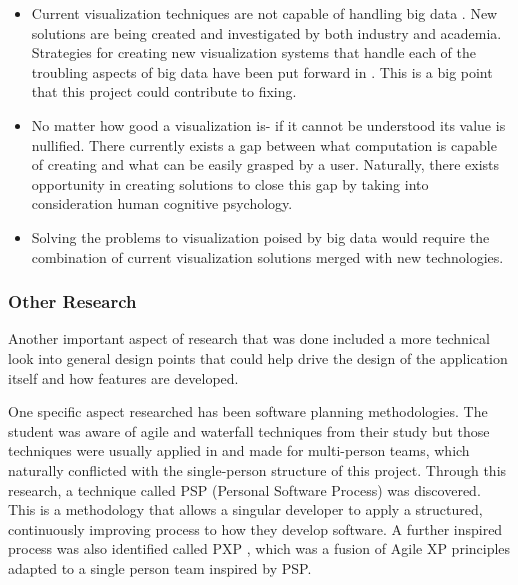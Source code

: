 \begin{itemize}
    \item Current visualization techniques are not capable of handling big data \cite[]{7918044}. New solutions are being created and investigated by both industry and academia. Strategies for creating new visualization systems that handle each of the troubling aspects of big data have been put forward in \cite[]{9523950}. This is a big point that this project could contribute to fixing.
    \item No matter how good a visualization is- if it cannot be understood its value is nullified. There currently exists a gap between what computation is capable of creating and what can be easily grasped by a user. Naturally, there exists opportunity in creating solutions to close this gap by taking into consideration human cognitive psychology. \cite{olshannikova_2015_visualizing}
    \item Solving the problems to visualization poised by big data would require the combination of current visualization solutions merged with new technologies. \cite[]{olshannikova_2015_visualizing}
\end{itemize}

\subsubsection{Other Research} \label{otherresearch}
Another important aspect of research that was done included a more technical look into general design points that could help drive the design of the application itself and how features are developed.

One specific aspect researched has been software planning methodologies. The student was aware of agile and waterfall techniques from their study but those techniques were usually applied in and made for multi-person teams, which naturally conflicted with the single-person structure of this project. Through this research, a technique called PSP \cite[]{493023} (Personal Software Process) was discovered. This is a methodology that allows a singular developer to apply a structured, continuously improving process to how they develop software. A further inspired process was also identified called PXP \cite[]{10.1145/1593105.1593127}, which was a fusion of Agile XP principles adapted to a single person team inspired by PSP.

